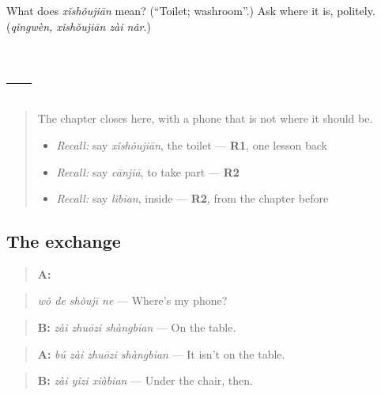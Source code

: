 \begin{tcolorbox}[breakable,colback=teal!4,colframe=teal!35!black,title={Before you move on}]
What does \emph{xǐshǒujiān} mean? (\textquotedblleft{}Toilet; washroom\textquotedblright{}.) Ask where it is, politely. (\emph{qǐngwèn, xǐshǒujiān zài nǎr}.)
\end{tcolorbox}
\section[Practice]{ — }

\label{lesson:ZH-C86-practice}



\begin{quote}
The chapter closes here, with a phone that is not where it should be.

\begin{itemize}
\raggedright
  \item \emph{Recall:} say \emph{xǐshǒujiān}, the toilet — \textbf{R1}, one lesson back
  \item \emph{Recall:} say \emph{cānjiā}, to take part — \textbf{R2}
  \item \emph{Recall:} say \emph{lǐbian}, inside — \textbf{R2}, from the chapter before
\end{itemize}
\end{quote}

\subsection*{The exchange}
\begin{quote}
\textbf{A:} 
\end{quote}

\begin{quote}
\emph{wǒ de shǒujī ne} — Where's my phone?
\end{quote}

\begin{quote}
\textbf{B:} \emph{zài zhuōzi shàngbian} — On the table.
\end{quote}

\begin{quote}
\textbf{A:} \emph{bú zài zhuōzi shàngbian} — It isn't on the table.
\end{quote}

\begin{quote}
\textbf{B:} \emph{zài yǐzi xiàbian} — Under the chair, then.
\end{quote}

